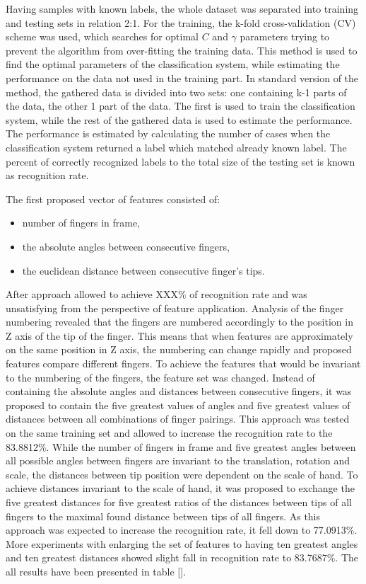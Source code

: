 Having samples with known labels, the whole dataset was separated into training and testing sets in relation 2:1. 
For the training, the k-fold cross-validation (CV) scheme was used, which searches for optimal $C$ and $\gamma$ parameters trying to prevent the algorithm from over-fitting the training data.
This method is used to find the optimal parameters of the classification system, while estimating the performance on the data not used in the training part. 
In standard version of the method, the gathered data is divided into two sets: one containing k-1 parts of the data, the other 1 part of the data. 
The first is used to train the classification system, while the rest of the gathered data is used to estimate the performance. 
The performance is estimated by calculating the number of cases when the classification system returned a label which matched already known label. 
The percent of correctly recognized labels to the total size of the testing set is known as recognition rate.



The first proposed vector of features consisted of:
\begin{itemize}
\item number of fingers in frame,
\item the absolute angles between consecutive fingers,
\item the euclidean distance between consecutive finger's tips.
\end{itemize} 
After approach allowed to achieve XXX\% of recognition rate and was unsatisfying from the perspective of feature application. 
Analysis of the finger numbering revealed that the fingers are numbered accordingly to the position in Z axis of the tip of the finger.
This means that when features are approximately on the same position in Z axis, the numbering can change rapidly and proposed features compare different fingers.
To achieve the features that would be invariant to the numbering of the fingers, the feature set was changed.
Instead of containing the absolute angles and distances between consecutive fingers, it was proposed to contain the five greatest values of angles and five greatest values of distances between all combinations of finger pairings.
This approach was tested on the same training set and allowed to increase the recognition rate to the 83.8812\%.
While the number of fingers in frame and five greatest angles between all possible angles between fingers are invariant to the translation, rotation and scale, the distances between tip position were dependent on the scale of hand.
To achieve distances invariant to the scale of hand, it was proposed to exchange the five greatest distances for five greatest ratios of the distances between tips of all fingers to the maximal found distance between tips of all fingers.
As this approach was expected to increase the recognition rate, it fell down to 77.0913\%.
More experiments with enlarging the set of features to having ten greatest angles and ten greatest distances showed slight fall in recognition rate to 83.7687\%. 
The all results have been presented in table [].

